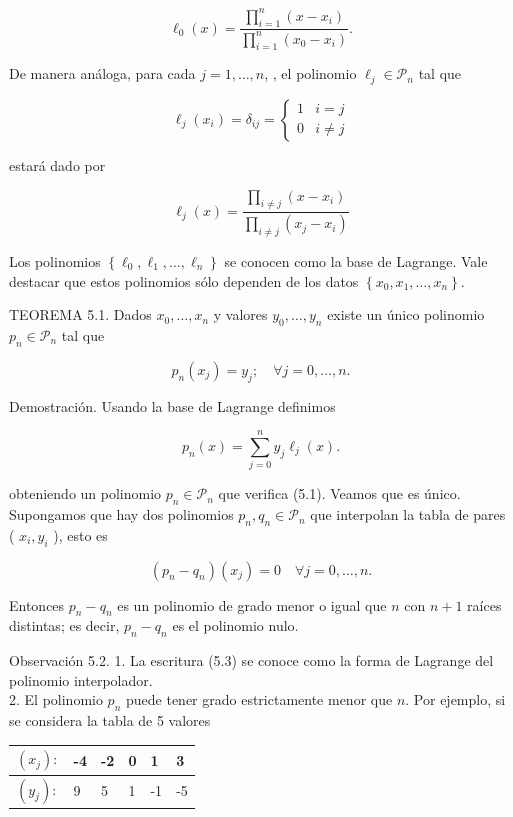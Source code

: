 \documentclass[10pt]{book}
\begin{document}
$$
\ell_{0}(x)=\frac{\prod_{i=1}^{n}\left(x-x_{i}\right)}{\prod_{i=1}^{n}\left(x_{0}-x_{i}\right)} .
$$

De manera análoga, para cada $j=1, \ldots, n$, , el polinomio $\ell_{j} \in \mathcal{P}_{n}$ tal que

$$
\ell_{j}\left(x_{i}\right)=\delta_{i j}= \begin{cases}1 & i=j \\ 0 & i \neq j\end{cases}
$$

estará dado por


\begin{equation*}
\ell_{j}(x)=\frac{\prod_{i \neq j}\left(x-x_{i}\right)}{\prod_{i \neq j}\left(x_{j}-x_{i}\right)} \tag{5.2}
\end{equation*}


Los polinomios $\left\{\ell_{0}, \ell_{1}, \ldots, \ell_{n}\right\}$ se conocen como la base de Lagrange. Vale destacar que estos polinomios sólo dependen de los datos $\left\{x_{0}, x_{1}, \ldots, x_{n}\right\}$.

TEOREMA 5.1. Dados $x_{0}, \ldots, x_{n}$ y valores $y_{0}, \ldots, y_{n}$ existe un único polinomio $p_{n} \in \mathcal{P}_{n}$ tal que

$$
p_{n}\left(x_{j}\right)=y_{j} ; \quad \forall j=0, \ldots, n .
$$

Demostración. Usando la base de Lagrange definimos


\begin{equation*}
p_{n}(x)=\sum_{j=0}^{n} y_{j} \ell_{j}(x) . \tag{5.3}
\end{equation*}


obteniendo un polinomio $p_{n} \in \mathcal{P}_{n}$ que verifica (5.1). Veamos que es único. Supongamos que hay dos polinomios $p_{n}, q_{n} \in \mathcal{P}_{n}$ que interpolan la tabla de pares ( $x_{i}, y_{i}$ ), esto es

$$
\left(p_{n}-q_{n}\right)\left(x_{j}\right)=0 \quad \forall j=0, \ldots, n .
$$

Entonces $p_{n}-q_{n}$ es un polinomio de grado menor o igual que $n$ con $n+1$ raíces distintas; es decir, $p_{n}-q_{n}$ es el polinomio nulo.

Observación 5.2. 1. La escritura (5.3) se conoce como la forma de Lagrange del polinomio interpolador.\\
2. El polinomio $p_{n}$ puede tener grado estrictamente menor que $n$. Por ejemplo, si se considera la tabla de 5 valores

\begin{center}
\begin{tabular}{|l||l|l|l|l|l|}
\hline
$\left(x_{j}\right):$ & -4 & -2 & 0 & 1 & 3 \\
\hline
$\left(y_{j}\right):$ & 9 & 5 & 1 & -1 & -5 \\
\hline
\end{tabular}
\end{center}
\end{document}
